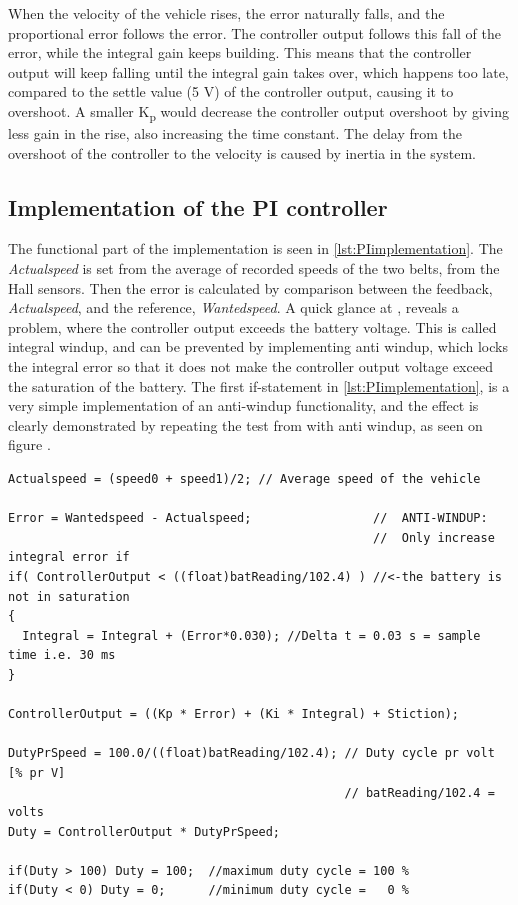 When the velocity of the vehicle rises, the error naturally falls, and the proportional error follows the error. The controller output follows this fall of the error, while the integral gain keeps building. This means that the controller output will keep falling until the integral gain takes over, which happens too late, compared to the settle value (5 V) of the controller output, causing it to overshoot. A smaller \si{K_p} would decrease the controller output overshoot by giving less gain in the rise, also increasing the time constant.
The delay from the overshoot of the controller to the velocity is caused by inertia in the system.
%
\subsection{Implementation of the PI controller}
The functional part of the implementation is seen in \autoref{lst:PIimplementation}. The \emph{Actualspeed} is set from the average of recorded speeds of the two belts, from the Hall sensors. Then the error is calculated by comparison between the feedback, \emph{Actualspeed}, and the reference, \emph{Wantedspeed}.
A quick glance at , reveals a problem, where the controller output exceeds the battery voltage. This is called integral windup, and can be prevented by implementing anti windup, which locks the integral error so that it does not make the controller output voltage exceed the saturation of the battery\cite{BGLiptak}. The first if-statement in \autoref{lst:PIimplementation}, is a very simple implementation of an anti-windup functionality, and the effect is clearly demonstrated by repeating the test from  with anti windup, as seen on figure .
%
\begin{lstlisting}
Actualspeed = (speed0 + speed1)/2; // Average speed of the vehicle

Error = Wantedspeed - Actualspeed;                 //  ANTI-WINDUP:
                                                   //  Only increase integral error if
if( ControllerOutput < ((float)batReading/102.4) ) //<-the battery is not in saturation
{
  Integral = Integral + (Error*0.030); //Delta t = 0.03 s = sample time i.e. 30 ms
}

ControllerOutput = ((Kp * Error) + (Ki * Integral) + Stiction);

DutyPrSpeed = 100.0/((float)batReading/102.4); // Duty cycle pr volt [% pr V]
                                               // batReading/102.4 = volts
Duty = ControllerOutput * DutyPrSpeed;

if(Duty > 100) Duty = 100;  //maximum duty cycle = 100 %
if(Duty < 0) Duty = 0;      //minimum duty cycle =   0 %
\end{lstlisting}
